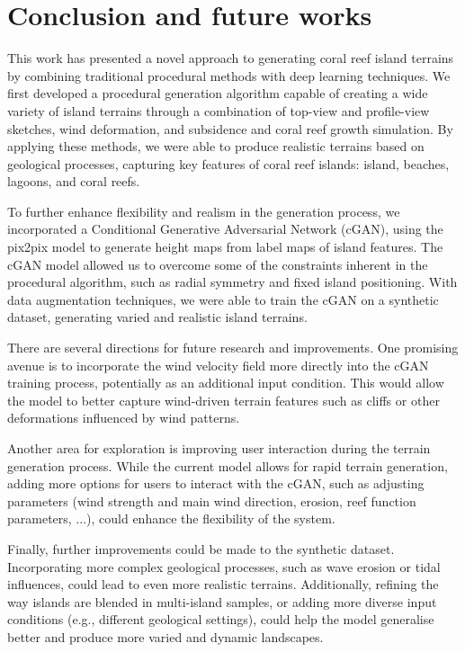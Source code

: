 \section{Conclusion and future works}
\label{sec:coral-island-conclusion}

This work has presented a novel approach to generating coral reef island terrains by combining traditional procedural methods with deep learning techniques. We first developed a procedural generation algorithm capable of creating a wide variety of island terrains through a combination of top-view and profile-view sketches, wind deformation, and subsidence and coral reef growth simulation. By applying these methods, we were able to produce realistic terrains based on geological processes, capturing key features of coral reef islands: island, beaches, lagoons, and coral reefs.

To further enhance flexibility and realism in the generation process, we incorporated a Conditional Generative Adversarial Network (cGAN), using the pix2pix model to generate height maps from label maps of island features. The cGAN model allowed us to overcome some of the constraints inherent in the procedural algorithm, such as radial symmetry and fixed island positioning. With data augmentation techniques, we were able to train the cGAN on a synthetic dataset, generating varied and realistic island terrains.


There are several directions for future research and improvements. One promising avenue is to incorporate the wind velocity field more directly into the cGAN training process, potentially as an additional input condition. This would allow the model to better capture wind-driven terrain features such as cliffs or other deformations influenced by wind patterns.

Another area for exploration is improving user interaction during the terrain generation process. While the current model allows for rapid terrain generation, adding more options for users to interact with the cGAN, such as adjusting parameters (wind strength and main wind direction, erosion, reef function parameters, ...), could enhance the flexibility of the system.

Finally, further improvements could be made to the synthetic dataset. Incorporating more complex geological processes, such as wave erosion or tidal influences, could lead to even more realistic terrains. Additionally, refining the way islands are blended in multi-island samples, or adding more diverse input conditions (e.g., different geological settings), could help the model generalise better and produce more varied and dynamic landscapes.


